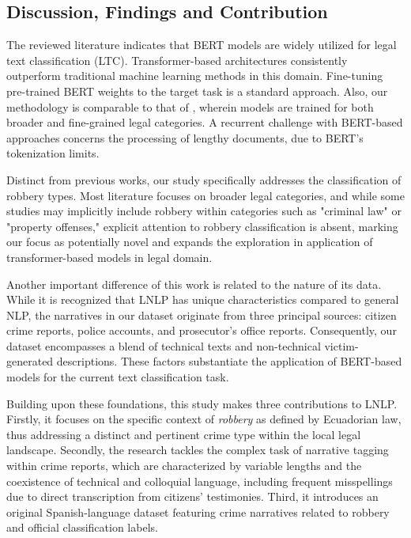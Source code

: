 \documentclass[runningheads]{llncs}
\begin{document}
\subsection{Discussion, Findings and Contribution}
\label{sec:discussion-findings}
The reviewed literature indicates that BERT models are widely utilized
for legal text classification (LTC). Transformer-based architectures
consistently outperform traditional machine learning methods in this
domain\cite{Akca2022}. Fine-tuning pre-trained BERT weights to the
target task is a standard approach. Also, our methodology is
comparable to that of \cite{Vatsal2023}, wherein models are trained
for both broader and fine-grained legal categories. A recurrent
challenge with BERT-based approaches concerns the processing of
lengthy documents, due to BERT's tokenization limits.

Distinct from previous works, our study specifically addresses the
classification of robbery types. Most literature focuses on broader
legal categories, and while some studies may implicitly include
robbery within categories such as "criminal law" or "property
offenses," explicit attention to robbery classification is absent,
marking our focus as potentially novel and expands the exploration in
application of transformer-based models in legal domain.

Another important difference of this work is related to the nature of
its data. While it is recognized that LNLP has unique characteristics
compared to general NLP, the narratives in our dataset originate from
three principal sources: citizen crime reports, police accounts, and
prosecutor's office reports. Consequently, our dataset encompasses a
blend of technical texts and non-technical victim-generated
descriptions. These factors substantiate the application of BERT-based
models for the current text classification task.


Building upon these foundations, this study makes three contributions
to LNLP. Firstly, it focuses on the specific context
of \textit{robbery} as defined by Ecuadorian law, thus addressing a
distinct and pertinent crime type within the local legal
landscape. Secondly, the research tackles the complex task of
narrative tagging within crime reports, which are characterized by
variable lengths and the coexistence of technical and colloquial
language, including frequent misspellings due to direct transcription
from citizens' testimonies. Third, it introduces an original
Spanish-language dataset featuring crime narratives related to robbery
and official classification labels.
\end{document}
